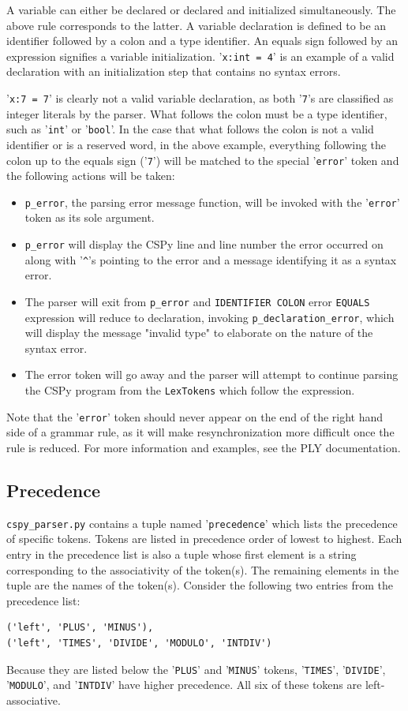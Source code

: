 \documentclass{article}
\begin{document}
A variable can either be declared or declared and initialized simultaneously. The above rule corresponds to the latter. A variable declaration is defined to be an identifier followed by a colon and a type identifier. An equals sign followed by an expression signifies a variable initialization. '\verb|x:int = 4|' is an example of a valid declaration with an initialization step that contains no syntax errors.

'\verb|x:7 = 7|' is clearly not a valid variable declaration, as both '\verb|7|'s are classified as integer literals by the parser. What follows the colon must be a type identifier, such as '\verb|int|' or '\verb|bool|'. In the case that what follows the colon is not a valid identifier or is a reserved word, in the above example, everything following the colon up to the equals sign ('\verb|7|') will be matched to the special '\verb|error|' token and the following actions will be taken:
\begin{itemize}
  \item \verb|p_error|, the parsing error message function, will be invoked with the '\verb|error|' token as its sole argument.
  \item \verb|p_error| will display the CSPy line and line number the error occurred on along with '\verb|^|'s pointing to the error and a message identifying it as a syntax error.
  \item The parser will exit from \verb|p_error| and \verb|IDENTIFIER COLON| error \verb|EQUALS| expression will reduce to declaration, invoking \verb|p_declaration_error|, which will display the message "invalid type" to elaborate on the nature of the syntax error.
  \item The error token will go away and the parser will attempt to continue parsing the CSPy program from the \verb|LexTokens| which follow the expression.
\end{itemize}
Note that the '\verb|error|' token should never appear on the end of the right hand side of a grammar rule, as it will make resynchronization more difficult once the rule is reduced. For more information and examples, see the PLY documentation.
\subsection{Precedence}
\verb|cspy_parser.py| contains a tuple named '\verb|precedence|' which lists the precedence of specific tokens. Tokens are listed in precedence order of lowest to highest. Each entry in the precedence list is also a tuple whose first element is a string corresponding to the associativity of the token(s). The remaining elements in the tuple are the names of the token(s). Consider the following two entries from the precedence list:
\begin{verbatim}
('left', 'PLUS', 'MINUS'),
('left', 'TIMES', 'DIVIDE', 'MODULO', 'INTDIV')
\end{verbatim}
Because they are listed below the '\verb|PLUS|' and '\verb|MINUS|' tokens, '\verb|TIMES|', '\verb|DIVIDE|', '\verb|MODULO|', and '\verb|INTDIV|' have higher precedence. All six of these tokens are left-associative.
\end{document}
